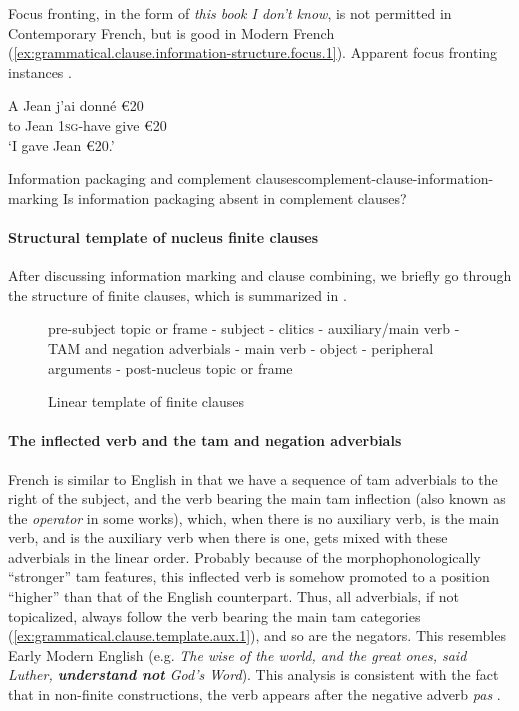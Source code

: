 \documentclass[a4paper, oneside, 12pt]{report}
\newcommand*{\citesec}[1]{\S~{#1}}
\newcommand*{\citepage}[1]{p.~{#1}}
\newcommand*{\term}[1]{\emph{#1}}
\newcommand{\form}[1]{\emph{#1}}
\newcommand*{\category}[1]{\textsc{#1}}
\newcommand{\translate}[1]{`#1'}
\newcommand*{\focus}[1]{\textbf{#1}}
\begin{document}
Focus fronting, in the form of \form{this book I don't know},
is not permitted in Contemporary French, but is good in Modern French
(\ref{ex:grammatical.clause.information-structure.focus.1}).
Apparent focus fronting instances \citep[\citesec{5.4}]{rowlett2007syntax}.

\begin{exe}
    \ex\label{ex:grammatical.clause.information-structure.focus.1}
    \gll  A  Jean j’ai                 donné €20 \\
          to Jean \category{1sg}-have  give  €20 \\
    \glt\translate{I gave Jean €20.}
\end{exe}

\begin{todobox}{Information packaging and complement clauses}{complement-clause-information-marking}
    Is information packaging absent in complement clauses?
\end{todobox}

\paragraph*{Structural template of nucleus finite clauses}
After discussing information marking and clause combining,
we briefly go through the structure of finite clauses,
which is summarized in .

\begin{figure}[H]
    \caption{Linear template of finite clauses}
    \label{fig:finite-clause-template}
    \centering
    pre-subject topic or frame - subject - clitics - auxiliary/main verb - TAM and negation adverbials - main verb - object - peripheral arguments - post-nucleus topic or frame
\end{figure}

\paragraph*{The inflected verb and the \ac{tam} and negation adverbials}
French is similar to English in that we have a sequence of \ac{tam} adverbials to the right of the subject,
and the verb bearing the main \ac{tam} inflection (also known as the \term{operator} in some works),
which, when there is no auxiliary verb, is the main verb,
and is the auxiliary verb when there is one,
gets mixed with these adverbials in the linear order.
Probably because of the morphophonologically ``stronger'' \ac{tam} features, 
this inflected verb is somehow promoted to a position ``higher'' than 
that of the English counterpart.
Thus, all adverbials, if not topicalized, 
always follow the verb bearing the main \ac{tam} categories (\ref{ex:grammatical.clause.template.aux.1}), 
and so are the negators. 
This resembles Early Modern English 
(e.g. \form{The wise of the world, and the great ones, said Luther, 
\focus{understand not} God's Word}).
This analysis is consistent with the fact that in non-finite constructions,
the verb appears after the negative adverb \form{pas}
\citep[\citepage{108}]{rowlett2007syntax}.
\end{document}
